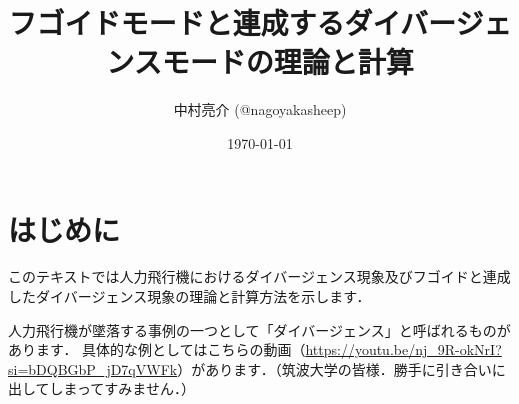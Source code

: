 \documentclass{jarticle}
\title{フゴイドモードと連成するダイバージェンスモードの理論と計算}
\author{中村亮介 (@nagoyakasheep) }
\date{\today} %
\begin{document}
\maketitle

\section{はじめに}

このテキストでは人力飛行機におけるダイバージェンス現象及びフゴイドと連成したダイバージェンス現象の理論と計算方法を示します．

人力飛行機が墜落する事例の一つとして「ダイバージェンス」と呼ばれるものがあります．
具体的な例としてはこちらの動画（\url{https://youtu.be/nj_9R-okNrI?si=bDQBGbP_jD7qVWFk}）があります．（筑波大学の皆様．勝手に引き合いに出してしまってすみません．）
\end{document}
